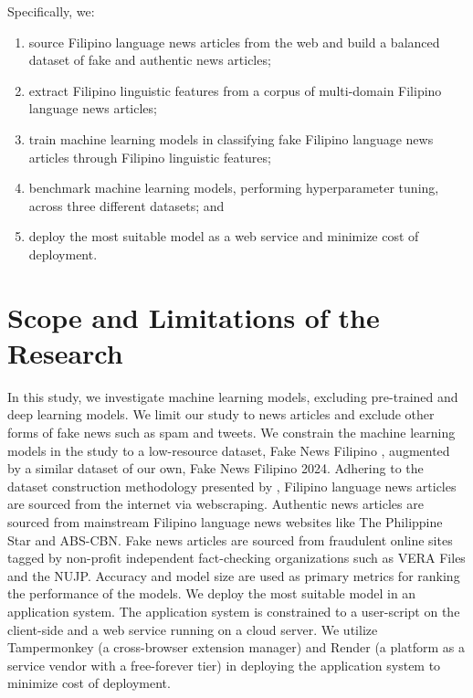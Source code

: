 Specifically, we:

\begin{enumerate}
   \item source Filipino language news articles from the web and build a balanced dataset of fake and authentic news articles;
   \item extract Filipino linguistic features from a corpus of multi-domain Filipino language news articles;
   \item train machine learning models in classifying fake Filipino language news articles through Filipino linguistic features;
   \item benchmark machine learning models, performing hyperparameter tuning, across three different datasets; and
   \item deploy the most suitable model as a web service and minimize cost of deployment.
\end{enumerate}

\section{Scope and Limitations of the Research}
\label{sec:scopelimitations}

In this study, we investigate machine learning models, excluding pre-trained and deep learning models. We limit our study to news articles and exclude other forms of fake news such as spam and tweets. We constrain the machine learning models in the study to a low-resource dataset, Fake News Filipino \cite{fake-news-filipino}, augmented by a similar dataset of our own, Fake News Filipino 2024. Adhering to the dataset construction methodology presented by , Filipino language news articles are sourced from the internet via webscraping. Authentic news articles are sourced from mainstream Filipino language news websites like The Philippine Star and ABS-CBN. Fake news articles are sourced from fraudulent online sites tagged by non-profit independent fact-checking organizations such as VERA Files and the NUJP. Accuracy and model size are used as primary metrics for ranking the performance of the models. We deploy the most suitable model in an application system. The application system is constrained to a user-script on the client-side and a web service running on a cloud server. We utilize Tampermonkey (a cross-browser extension manager) and Render (a platform as a service vendor with a free-forever tier) in deploying the application system to minimize cost of deployment.

